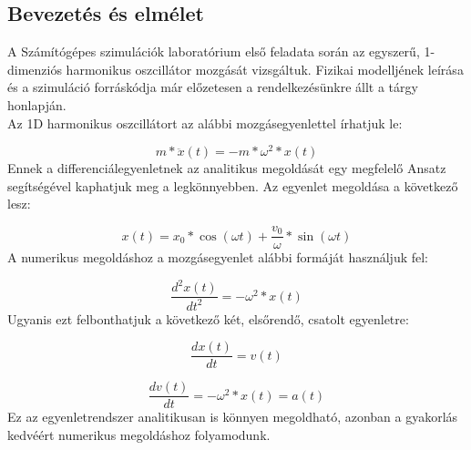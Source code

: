 \begin{multicols}{2}
\section{Bevezetés és elmélet} \label{sec:1}
A Számítógépes szimulációk laboratórium első feladata során az egyszerű, 1-dimenziós harmonikus oszcillátor mozgását vizsgáltuk. Fizikai modelljének leírása és a szimuláció forráskódja már előzetesen a rendelkezésünkre állt a tárgy honlapján\cite{szamszin}. \\
Az 1D harmonikus oszcillátort az alábbi mozgásegyenlettel írhatjuk le:

\begin{equation} \label{eq:1.1}
    m * \ddot{x} \left( t \right)  = - m * \omega^{2} * x \left( t \right)
\end{equation}
Ennek a differenciálegyenletnek az analitikus megoldását egy megfelelő Ansatz segítségével kaphatjuk meg a legkönnyebben. Az egyenlet megoldása a következő lesz:

\begin{equation} \label{eq:1.2}
    x \left( t \right)  = x_{0} * \cos(\omega t) + \frac{v_{0}}{\omega} * \sin(\omega t)
\end{equation}
A numerikus megoldáshoz a mozgásegyenlet alábbi formáját használjuk fel:

\begin{equation} \label{eq:1.3}
    \frac{d^{2} x \left( t \right) }{d t^{2}} = - \omega^{2} * x \left( t \right) 
\end{equation}
Ugyanis ezt felbonthatjuk a következő két, elsőrendő, csatolt egyenletre:

\begin{equation} \label{eq:1.4}
    \frac{dx \left( t \right)}{dt} = v \left( t \right) 
\end{equation}

\begin{equation} \label{eq:1.5}
    \frac{dv \left( t \right)}{dt} = - \omega^{2} * x \left( t \right) = a \left( t \right)
\end{equation}
Ez az egyenletrendszer analitikusan is könnyen megoldható, azonban a gyakorlás kedvéért numerikus megoldáshoz folyamodunk.


\end{multicols}
